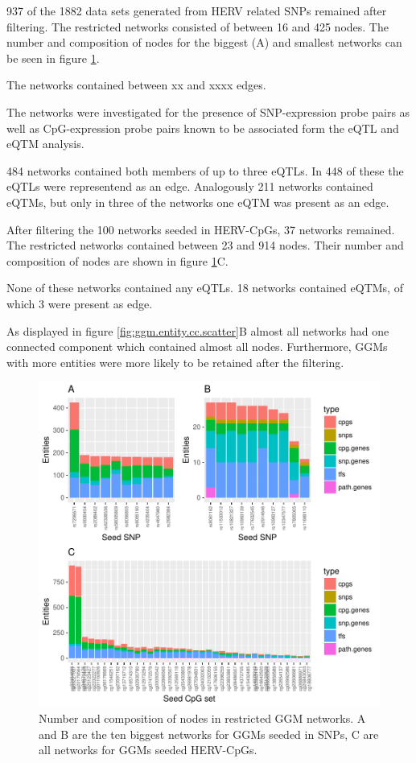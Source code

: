 \documentclass[a4paper,12pt,twoside,openright]{report}
\begin{document}
937 of the 1882 data sets generated from HERV related SNPs remained after filtering. The restricted networks consisted of between 16 and 425 nodes. The number and composition of nodes for the biggest (A) and smallest networks can be seen in figure \ref{fig:ggm.cc.nodes.bar}.

The networks contained between xx and xxxx edges. 

The networks were investigated for the presence of SNP-expression probe pairs as well as CpG-expression probe pairs known to be associated form the eQTL and eQTM analysis. 

484 networks contained both members of up to three eQTLs. In 448 of these the eQTLs were representend as an edge. Analogously 211 networks contained eQTMs, but only in three of the networks one eQTM was present as an edge. 

After filtering the 100 networks seeded in HERV-CpGs, 37 networks remained. The restricted networks contained between 23 and 914 nodes. Their number and composition of nodes are shown in figure \ref{fig:ggm.cc.nodes.bar}C. 

None of these networks contained any eQTLs. 18 networks contained eQTMs, of which 3 were present as edge. 

As displayed in figure \ref{fig:ggm.entity.cc.scatter}B almost all networks had one connected component which contained almost all nodes. Furthermore, GGMs with more entities were more likely to be retained after the filtering. 

\begin{figure}[tb]
	\includegraphics[scale = 1, keepaspectratio = true]{../figures/hervS2_ggm_cc_nodes_bar}  
	\caption{Number and composition of nodes in restricted GGM networks. A and B are the ten biggest networks for GGMs seeded in SNPs, C are all networks for GGMs seeded HERV-CpGs.}
    \label{fig:ggm.cc.nodes.bar}
\end{figure}
\end{document}
